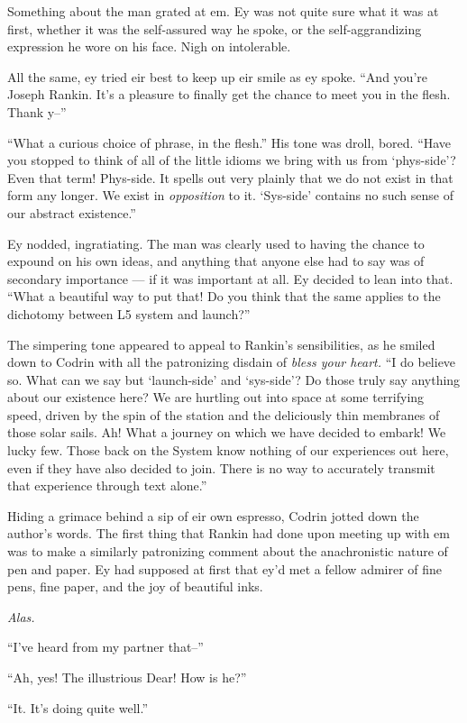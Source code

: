 Something about the man grated at em. Ey was not quite sure what it was at first, whether it was the self-assured way he spoke, or the self-aggrandizing expression he wore on his face. Nigh on intolerable.

All the same, ey tried eir best to keep up eir smile as ey spoke. ``And you're Joseph Rankin. It's a pleasure to finally get the chance to meet you in the flesh. Thank y--''

``What a curious choice of phrase, in the flesh.'' His tone was droll, bored. ``Have you stopped to think of all of the little idioms we bring with us from `phys-side'? Even that term! Phys-side. It spells out very plainly that we do not exist in that form any longer. We exist in \emph{opposition} to it. `Sys-side' contains no such sense of our abstract existence.''

Ey nodded, ingratiating. The man was clearly used to having the chance to expound on his own ideas, and anything that anyone else had to say was of secondary importance — if it was important at all. Ey decided to lean into that. ``What a beautiful way to put that! Do you think that the same applies to the dichotomy between L5 system and launch?''

The simpering tone appeared to appeal to Rankin's sensibilities, as he smiled down to Codrin with all the patronizing disdain of \emph{bless your heart.} ``I do believe so. What can we say but `launch-side' and `sys-side'? Do those truly say anything about our existence here? We are hurtling out into space at some terrifying speed, driven by the spin of the station and the deliciously thin membranes of those solar sails. Ah! What a journey on which we have decided to embark! We lucky few. Those back on the System know nothing of our experiences out here, even if they have also decided to join. There is no way to accurately transmit that experience through text alone.''

Hiding a grimace behind a sip of eir own espresso, Codrin jotted down the author's words. The first thing that Rankin had done upon meeting up with em was to make a similarly patronizing comment about the anachronistic nature of pen and paper. Ey had supposed at first that ey'd met a fellow admirer of fine pens, fine paper, and the joy of beautiful inks.

\emph{Alas.}

``I've heard from my partner that--''

``Ah, yes! The illustrious Dear! How is he?''

``It. It's doing quite well.''

